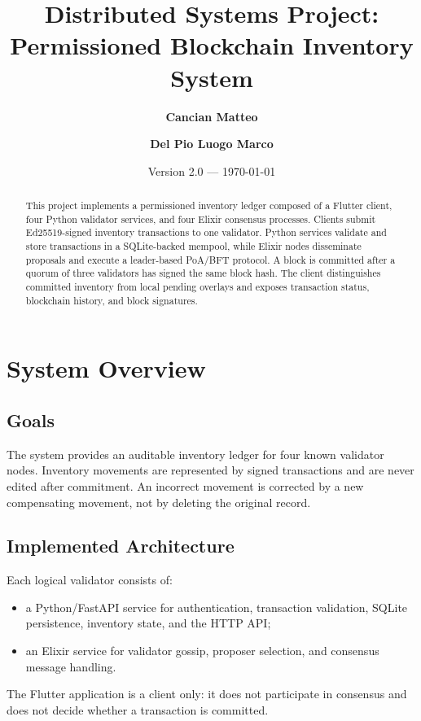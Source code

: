 \documentclass[11pt,a4paper]{memoir}
\title{\textbf{Distributed Systems Project:\\Permissioned Blockchain Inventory System}}
\author{\textbf{Cancian Matteo} \and \textbf{Del Pio Luogo Marco}}
\date{Version 2.0 --- \today}
\begin{document}
\maketitle

\begin{abstract}
This project implements a permissioned inventory ledger composed of a Flutter
client, four Python validator services, and four Elixir consensus processes.
Clients submit Ed25519-signed inventory transactions to one validator. Python
services validate and store transactions in a SQLite-backed mempool, while
Elixir nodes disseminate proposals and execute a leader-based PoA/BFT
protocol. A block is committed after a quorum of three validators has signed
the same block hash. The client distinguishes committed inventory from local
pending overlays and exposes transaction status, blockchain history, and
block signatures.
\end{abstract}

\tableofcontents
\clearpage

\chapter{System Overview}

\section{Goals}
The system provides an auditable inventory ledger for four known validator
nodes. Inventory movements are represented by signed transactions and are
never edited after commitment. An incorrect movement is corrected by a new
compensating movement, not by deleting the original record.

\section{Implemented Architecture}
Each logical validator consists of:
\begin{itemize}
  \item a Python/FastAPI service for authentication, transaction validation,
        SQLite persistence, inventory state, and the HTTP API;
  \item an Elixir service for validator gossip, proposer selection, and
        consensus message handling.
\end{itemize}
The Flutter application is a client only: it does not participate in
consensus and does not decide whether a transaction is committed.
\end{document}
